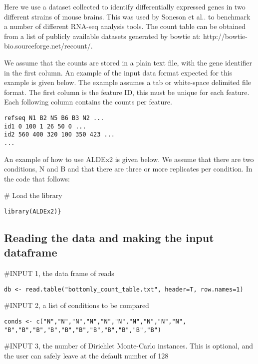 \documentclass[11pt]{article}
\begin{document}
Here we use a dataset collected to identify differentially expressed genes in two different strains of mouse brains. This was used by Soneson et al.. \cite{Soneson:2013} to benchmark a number of different RNA-seq analysis tools. The count table can be obtained from a list of  publicly available datasets generated by bowtie at: http://bowtie-bio.sourceforge.net/recount/.

We assume that the counts are stored in a plain text file, with the gene identifier in the first column. An example of the input data format expected for this example is given below. The example assumes a tab or white-space delimited file format. The first column is the feature ID, this must be unique for each feature. Each following column contains the counts per feature.
\begin{verbatim}
refseq N1 B2 N5 B6 B3 N2 ...
id1 0 100 1 26 50 0 ...
id2 560 400 320 100 350 423 ...
...
\end{verbatim}

An example of how to use ALDEx2 is given below. We assume that there are two conditions, N and B and that there are three or more replicates per condition. In the code that follows:

\noindent \#  Load the library\\
\begin{verbatim}library(ALDEx2)}
\end{verbatim}

\subsection{Reading the data and making the input dataframe}

\noindent\#INPUT 1, the data frame of reads\\
\begin{verbatim}db <- read.table("bottomly_count_table.txt", header=T, row.names=1)\end{verbatim}

\noindent\#INPUT 2, a list of conditions to be compared\\
\begin{verbatim}conds <- c("N","N","N","N","N","N","N","N","N","N",
"B","B","B","B","B","B","B","B","B","B","B")
\end{verbatim}

\noindent\#INPUT 3, the number of Dirichlet Monte-Carlo instances. This is optional, and the user can safely leave at the default number of 128\\
\end{document}
